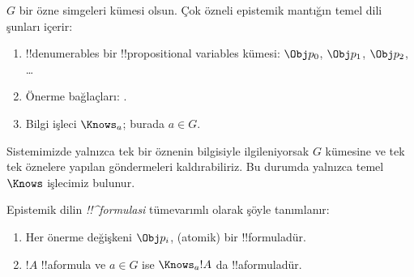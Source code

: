 \documentclass[../../../include/open-logic-section]{subfiles}
\begin{document}


\begin{defn}
$G$ bir özne simgeleri kümesi olsun. Çok özneli epistemik mantığın temel dili
şunları içerir:
\begin{enumerate}
  \item !!{denumerable}s bir !!{propositional variable}s kümesi: $\Obj
    p_0$, $\Obj p_1$, $\Obj p_2$, \dots
  \item Önerme bağlaçları: \startycommalist
  .
  \item Bilgi işleci $\Knows_a$; burada $a \in G$.
\end{enumerate}
\end{defn}

Sistemimizde yalnızca tek bir öznenin bilgisiyle ilgileniyorsak $G$ kümesine
ve tek tek öznelere yapılan göndermeleri kaldırabiliriz. Bu durumda yalnızca
temel $\Knows$ işlecimiz bulunur.

\begin{defn}
Epistemik dilin \emph{!!^{formula}s{}i} tümevarımlı olarak şöyle tanımlanır:
\begin{enumerate}


\item Her önerme değişkeni $\Obj p_i$, (atomik) bir !!{formula}{}dür.






\item $!A$ !!a{formula} ve $a \in G$ ise $\Knows_a !A$ da
  !!a{formula}{}dür.

\end{enumerate}
\end{defn}
\end{document}
